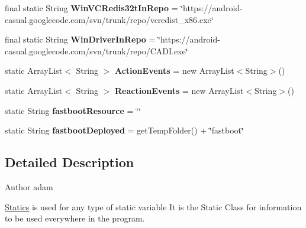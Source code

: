 \begin{DoxyCompactItemize}
\item 
\hypertarget{classCASUAL_1_1Statics_a3683953dc6325c239a4e77b64c2d448a}{final static String {\bfseries Win\-V\-C\-Redis32t\-In\-Repo} = \char`\"{}https\-://android-\/casual.\-googlecode.\-com/svn/trunk/repo/vcredist\-\_\-x86.\-exe\char`\"{}}\label{classCASUAL_1_1Statics_a3683953dc6325c239a4e77b64c2d448a}

\item 
\hypertarget{classCASUAL_1_1Statics_a093232a6f30ebc39d13d7039ca94c00f}{final static String {\bfseries Win\-Driver\-In\-Repo} = \char`\"{}https\-://android-\/casual.\-googlecode.\-com/svn/trunk/repo/C\-A\-D\-I.\-exe\char`\"{}}\label{classCASUAL_1_1Statics_a093232a6f30ebc39d13d7039ca94c00f}

\item 
\hypertarget{classCASUAL_1_1Statics_a51c80088d97e27049838692918feb6e3}{static Array\-List$<$ String $>$ {\bfseries Action\-Events} = new Array\-List$<$String$>$()}\label{classCASUAL_1_1Statics_a51c80088d97e27049838692918feb6e3}

\item 
\hypertarget{classCASUAL_1_1Statics_ae248127b02774a33b247b7bc1e4bf41c}{static Array\-List$<$ String $>$ {\bfseries Reaction\-Events} = new Array\-List$<$String$>$()}\label{classCASUAL_1_1Statics_ae248127b02774a33b247b7bc1e4bf41c}

\item 
\hypertarget{classCASUAL_1_1Statics_a11872ac606a7d0c3988397453b2432fa}{static String {\bfseries fastboot\-Resource} = \char`\"{}\char`\"{}}\label{classCASUAL_1_1Statics_a11872ac606a7d0c3988397453b2432fa}

\item 
\hypertarget{classCASUAL_1_1Statics_abd6bee5b99f137f16b6a252f65a2e31a}{static String {\bfseries fastboot\-Deployed} = get\-Temp\-Folder() + \char`\"{}fastboot\char`\"{}}\label{classCASUAL_1_1Statics_abd6bee5b99f137f16b6a252f65a2e31a}

\end{DoxyCompactItemize}


\subsection{Detailed Description}
\begin{DoxyAuthor}{Author}
adam
\end{DoxyAuthor}
\hyperlink{classCASUAL_1_1Statics}{Statics} is used for any type of static variable It is the Static Class for information to be used everywhere in the program. 


